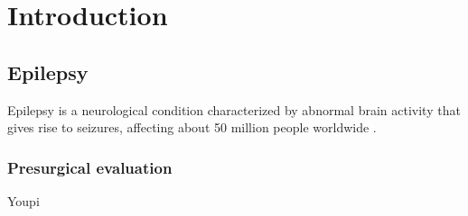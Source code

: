 \chapter{Introduction}
\label{chap:intro}
\minitoc


\section{Epilepsy}

Epilepsy is a neurological condition characterized by abnormal brain activity that gives rise to seizures, affecting about 50 million people worldwide \cite{fiest_prevalence_2017}.


\subsection{Presurgical evaluation}

Youpi
